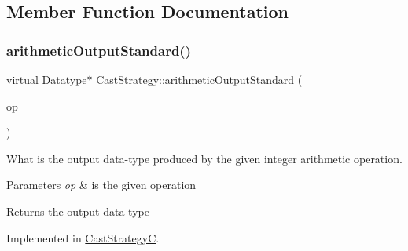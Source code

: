 \subsection{Member Function Documentation}
\mbox{\label{class_cast_strategy_ae1b79520df9f5b6dc22afb6969606054}} 
\subsubsection{\texorpdfstring{arithmeticOutputStandard()}{arithmeticOutputStandard()}}
{\footnotesize\ttfamily virtual \mbox{\hyperlink{class_datatype}{Datatype}}$\ast$ Cast\+Strategy\+::arithmetic\+Output\+Standard (\begin{DoxyParamCaption}\item[{const \mbox{\hyperlink{class_pcode_op}{Pcode\+Op}} $\ast$}]{op }\end{DoxyParamCaption})\hspace{0.3cm}{\ttfamily [pure virtual]}}



What is the output data-\/type produced by the given integer arithmetic operation. 


\begin{DoxyParams}{Parameters}
{\em op} & is the given operation \\
\hline
\end{DoxyParams}
\begin{DoxyReturn}{Returns}
the output data-\/type 
\end{DoxyReturn}


Implemented in \mbox{\hyperlink{class_cast_strategy_c_a478423d83d44c4c2d28a461dad75654c}{Cast\+StrategyC}}.

